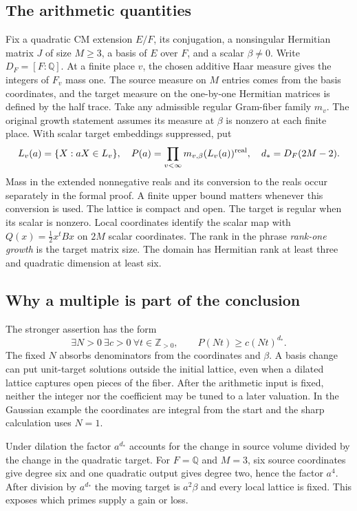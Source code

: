 \documentclass[12pt,letterpaper]{article}
\begin{document}
\subsection{The arithmetic quantities}
Fix a quadratic CM extension $E/F$, its conjugation, a nonsingular Hermitian matrix $J$ of size $M\ge3$, a basis of $E$ over $F$, and a scalar $\beta\ne0$. Write $D_F=[F:\mathbb Q]$. At a finite place $v$, the chosen additive Haar measure gives the integers of $F_v$ mass one. The source measure on $M$ entries comes from the basis coordinates, and the target measure on the one-by-one Hermitian matrices is defined by the half trace. Take any admissible regular Gram-fiber family $m_v$. The original growth statement assumes its measure at $\beta$ is nonzero at each finite place. With scalar target embeddings suppressed, put
\[
 L_v(a)=\{X:aX\in L_v\},\quad P(a)=\prod_{v<\infty}m_{v,\beta}(L_v(a))^{\rm real},\quad d_*=D_F(2M-2).
\]
Mass in the extended nonnegative reals and its conversion to the reals occur separately in the formal proof. A finite upper bound matters whenever this conversion is used. The lattice is compact and open. The target is regular when its scalar is nonzero. Local coordinates identify the scalar map with $Q(x)=\frac12 x^t Bx$ on $2M$ scalar coordinates. The rank in the phrase \emph{rank-one growth} is the target matrix size. The domain has Hermitian rank at least three and quadratic dimension at least six.
\subsection{Why a multiple is part of the conclusion}
The stronger assertion has the form
\[
 \exists N>0\ \exists c>0\ \forall t\in\mathbb Z_{>0},\qquad P(Nt)\ge c(Nt)^{d_*}.
\]
The fixed $N$ absorbs denominators from the coordinates and $\beta$. A basis change can put unit-target solutions outside the initial lattice, even when a dilated lattice captures open pieces of the fiber. After the arithmetic input is fixed, neither the integer nor the coefficient may be tuned to a later valuation. In the Gaussian example the coordinates are integral from the start and the sharp calculation uses $N=1$.
\par
Under dilation the factor $a^{d_*}$ accounts for the change in source volume divided by the change in the quadratic target. For $F=\mathbb Q$ and $M=3$, six source coordinates give degree six and one quadratic output gives degree two, hence the factor $a^4$. After division by $a^{d_*}$ the moving target is $a^2\beta$ and every local lattice is fixed. This exposes which primes supply a gain or loss.
\end{document}
